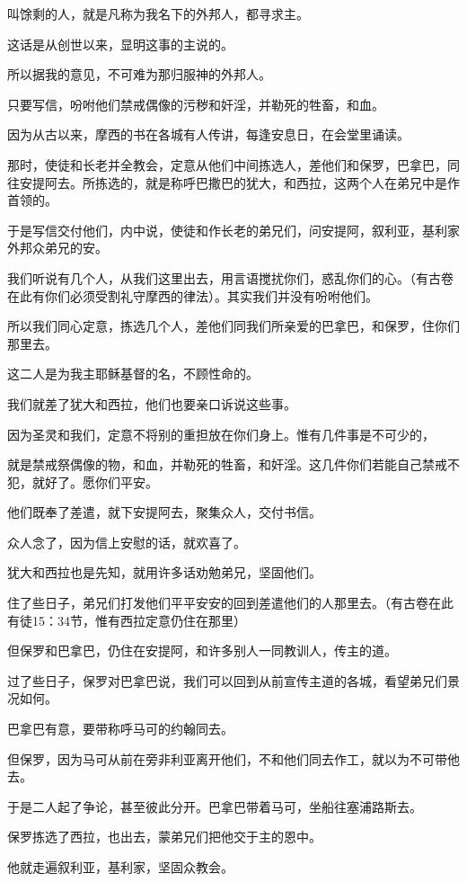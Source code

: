 \documentclass[12pt,oneside]{book}
\begin{document}
叫馀剩的人，就是凡称为我名下的外邦人，都寻求主。

这话是从创世以来，显明这事的主说的。

所以据我的意见，不可难为那归服神的外邦人。

只要写信，吩咐他们禁戒偶像的污秽和奸淫，并勒死的牲畜，和血。

因为从古以来，摩西的书在各城有人传讲，每逢安息日，在会堂里诵读。

那时，使徒和长老并全教会，定意从他们中间拣选人，差他们和保罗，巴拿巴，同往安提阿去。所拣选的，就是称呼巴撒巴的犹大，和西拉，这两个人在弟兄中是作首领的。

于是写信交付他们，内中说，使徒和作长老的弟兄们，问安提阿，叙利亚，基利家外邦众弟兄的安。

我们听说有几个人，从我们这里出去，用言语搅扰你们，惑乱你们的心。（有古卷在此有你们必须受割礼守摩西的律法）。其实我们并没有吩咐他们。

所以我们同心定意，拣选几个人，差他们同我们所亲爱的巴拿巴，和保罗，住你们那里去。

这二人是为我主耶稣基督的名，不顾性命的。

我们就差了犹大和西拉，他们也要亲口诉说这些事。

因为圣灵和我们，定意不将别的重担放在你们身上。惟有几件事是不可少的，

就是禁戒祭偶像的物，和血，并勒死的牲畜，和奸淫。这几件你们若能自己禁戒不犯，就好了。愿你们平安。

他们既奉了差遣，就下安提阿去，聚集众人，交付书信。

众人念了，因为信上安慰的话，就欢喜了。

犹大和西拉也是先知，就用许多话劝勉弟兄，坚固他们。

住了些日子，弟兄们打发他们平平安安的回到差遣他们的人那里去。（有古卷在此有徒15：34节，惟有西拉定意仍住在那里）

但保罗和巴拿巴，仍住在安提阿，和许多别人一同教训人，传主的道。

过了些日子，保罗对巴拿巴说，我们可以回到从前宣传主道的各城，看望弟兄们景况如何。

巴拿巴有意，要带称呼马可的约翰同去。

但保罗，因为马可从前在旁非利亚离开他们，不和他们同去作工，就以为不可带他去。

于是二人起了争论，甚至彼此分开。巴拿巴带着马可，坐船往塞浦路斯去。

保罗拣选了西拉，也出去，蒙弟兄们把他交于主的恩中。

他就走遍叙利亚，基利家，坚固众教会。
\end{document}
